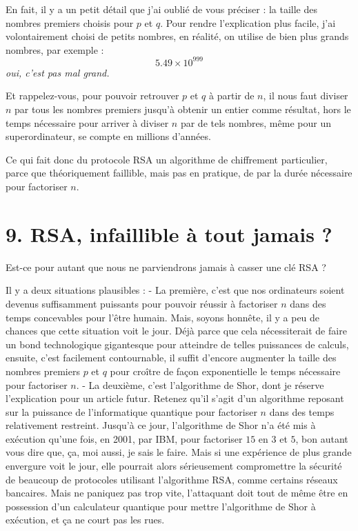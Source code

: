 \documentclass[
  paper=a4,
  ,captions=tableheading
]{scrartcl}
\begin{document}
En fait, il y a un petit détail que j'ai oublié de vous préciser : la
taille des nombres premiers choisis pour \(p\) et \(q\). Pour rendre
l'explication plus facile, j'ai volontairement choisi de petits nombres,
en réalité, on utilise de bien plus grands nombres, par exemple : \[
5.49 \times 10^{999}
\] \emph{oui, c'est pas mal grand.}

Et rappelez-vous, pour pouvoir retrouver \(p\) et \(q\) à partir de
\(n\), il nous faut diviser \(n\) par tous les nombres premiers jusqu'à
obtenir un entier comme résultat, hors le temps nécessaire pour arriver
à diviser \(n\) par de tels nombres, même pour un superordinateur, se
compte en millions d'années.

Ce qui fait donc du protocole RSA un algorithme de chiffrement
particulier, parce que théoriquement faillible, mais pas en pratique, de
par la durée nécessaire pour factoriser \(n\).

\section{9. RSA, infaillible à tout jamais
?}\label{rsa-infaillible-uxe0-tout-jamais}

Est-ce pour autant que nous ne parviendrons jamais à casser une clé RSA
?

Il y a deux situations plausibles : - La première, c'est que nos
ordinateurs soient devenus suffisamment puissants pour pouvoir réussir à
factoriser \(n\) dans des temps concevables pour l'être humain. Mais,
soyons honnête, il y a peu de chances que cette situation voit le jour.
Déjà parce que cela nécessiterait de faire un bond technologique
gigantesque pour atteindre de telles puissances de calculs, ensuite,
c'est facilement contournable, il suffit d'encore augmenter la taille
des nombres premiers \(p\) et \(q\) pour croître de façon exponentielle
le temps nécessaire pour factoriser \(n\). - La deuxième, c'est
l'algorithme de Shor, dont je réserve l'explication pour un article
futur. Retenez qu'il s'agit d'un algorithme reposant sur la puissance de
l'informatique quantique pour factoriser \(n\) dans des temps
relativement restreint. Jusqu'à ce jour, l'algorithme de Shor n'a été
mis à exécution qu'une fois, en 2001, par IBM, pour factoriser \(15\) en
\(3\) et \(5\), bon autant vous dire que, ça, moi aussi, je sais le
faire. Mais si une expérience de plus grande envergure voit le jour,
elle pourrait alors sérieusement compromettre la sécurité de beaucoup de
protocoles utilisant l'algorithme RSA, comme certains réseaux bancaires.
Mais ne paniquez pas trop vite, l'attaquant doit tout de même être en
possession d'un calculateur quantique pour mettre l'algorithme de Shor à
exécution, et ça ne court pas les rues.
\end{document}
